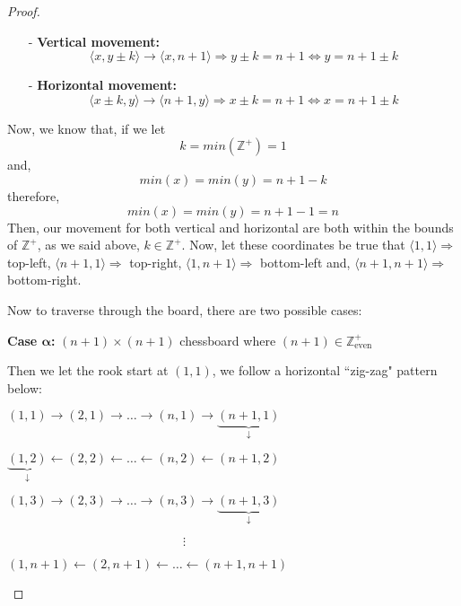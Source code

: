 \documentclass[12pt]{article}
\begin{document}
\begin{enumerate}[label=Part \Alph*)]
\begin{proof}[Proof]
		\begin{itemize}
    	\item[-] \textbf{Vertical movement:}
        $$\langle x, y \pm k \rangle \rightarrow \langle x, n+1 \rangle \Rightarrow y \pm k = n + 1 \Leftrightarrow y = n + 1 \pm k$$
    	\item[-] \textbf{Horizontal movement:}
        $$\langle x \pm k, y \rangle \rightarrow \langle n+1, y \rangle \Rightarrow x \pm k = n + 1 \Leftrightarrow x = n + 1 \pm k$$
		\end{itemize}

		Now, we know that, if we let
		$$k = min(\mathbb{Z}^{+}) = 1$$
		and, 
		$$min(x) = min(y) = n + 1 - k$$
		therefore,
		$$min(x) = min(y) = n + 1 - 1 = n$$
		Then, our movement for both vertical and horizontal are both within the bounds of $\mathbb{Z}^{+}$, as we said above, $k \in \mathbb{Z}^{+}$. Now, let these coordinates be true that $\langle 1, 1 \rangle \Rightarrow $ top-left, $\langle n + 1, 1 \rangle \Rightarrow $ top-right, $\langle 1, n + 1 \rangle \Rightarrow $ bottom-left and, $\langle n + 1, n + 1 \rangle \Rightarrow $ bottom-right. 

         Now to traverse through the board, there are two possible cases:
        
        \textbf{Case $\boldsymbol{\alpha}$:} $(n + 1) \times (n + 1)$ chessboard where $(n + 1) \in \mathbb{Z}_{\text{even}}^{+}$
        
        Then we let the rook start at $(1, 1)$,  we follow a horizontal ``zig-zag" pattern below:
        
        
        \begin{minipage}{\linewidth}
        \begin{center}
        $(1, 1) \rightarrow (2, 1) \rightarrow \ldots \rightarrow (n, 1) \rightarrow \underbrace{(n + 1, 1)}_{\downarrow}$
        
		$\underbrace{(1, 2)}_{\downarrow} \leftarrow (2, 2) \leftarrow \ldots \leftarrow  (n, 2) \leftarrow (n + 1, 2)$
		
		$(1, 3) \rightarrow (2, 3) \rightarrow \ldots \rightarrow  (n, 3) \rightarrow \underbrace{(n + 1, 3)}_{\downarrow}$
		
		$\hspace{168pt}\vdots\hspace{0pt}$
		
		$(1, n + 1) \leftarrow (2, n + 1) \leftarrow \ldots \leftarrow (n + 1, n + 1)$
		\end{center}
		\end{minipage}
		

\end{proof}
\end{enumerate}
\end{document}
